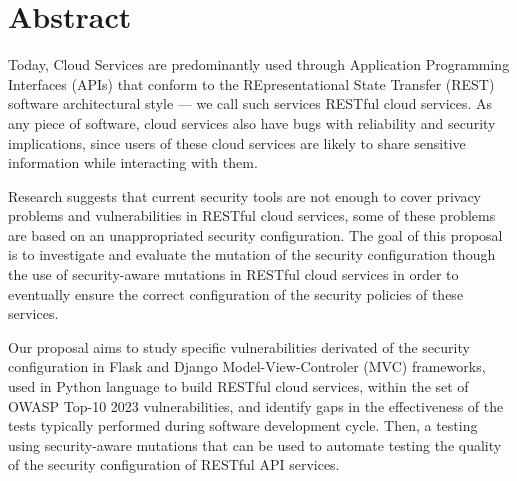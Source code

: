\chapter*{Abstract}
%

Today, Cloud Services are predominantly used through Application Programming Interfaces (APIs) that conform to the
REpresentational State Transfer (REST) software architectural style --- we call such services RESTful cloud services.
As any piece of software, cloud services also have bugs with reliability and security implications, since
users of these cloud services are likely to share sensitive information while interacting with them.

Research suggests that current security tools are not enough to cover privacy problems and vulnerabilities in RESTful cloud services, some of these problems are based on an unappropriated security configuration.
The goal of this proposal is to investigate and evaluate the mutation of the security configuration though the use of security-aware mutations in RESTful cloud services in order to eventually ensure the correct configuration of the security policies of these services.

Our proposal aims to study specific vulnerabilities derivated of the security configuration in Flask and Django Model-View-Controler (MVC) frameworks, used in
Python language to build RESTful cloud services, within the set of OWASP Top-10 2023 vulnerabilities, 
and identify gaps in the effectiveness of the tests typically performed during software development cycle.
Then, a testing using security-aware mutations that can be used to automate testing the quality of the security configuration of RESTful API services.

